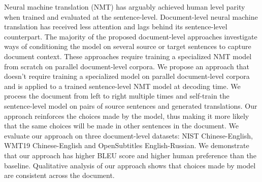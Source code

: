 Neural machine translation (NMT) has arguably achieved human level parity when trained and evaluated at the sentence-level. Document-level neural machine translation has received less attention and lags behind its sentence-level counterpart. The majority of the proposed document-level approaches investigate ways of conditioning the model on several source or target sentences to capture document context. These approaches require training a specialized NMT model from scratch on parallel document-level corpora. We propose an approach that doesn't require training a specialized model on parallel document-level corpora and is applied to a trained sentence-level NMT model at decoding time. We process the document from left to right multiple times and self-train the sentence-level model on pairs of source sentences and generated translations. Our approach reinforces the choices made by the model, thus making it more likely that the same choices will be made in other sentences in the document. We evaluate our approach on three document-level datasets: NIST Chinese-English, WMT19 Chinese-English and OpenSubtitles English-Russian. We demonstrate that our approach has higher BLEU score and higher human preference than the baseline. Qualitative analysis of our approach shows that choices made by model are consistent across the document.
